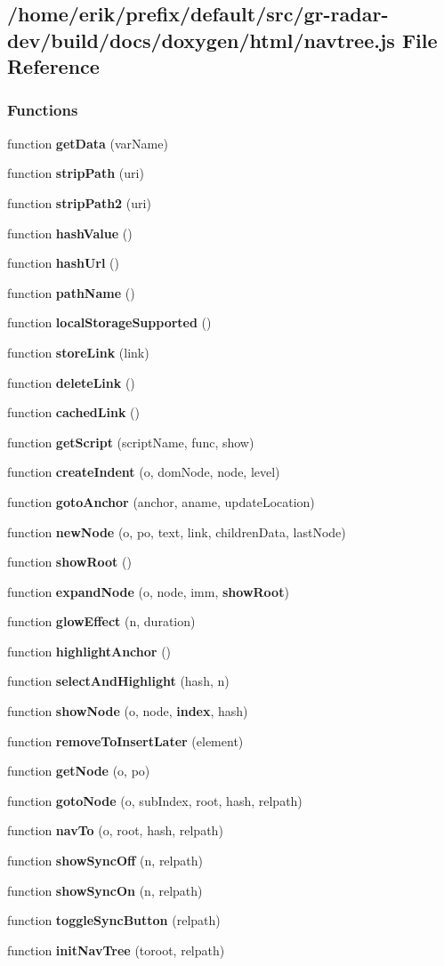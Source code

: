\subsection{/home/erik/prefix/default/src/gr-\/radar-\/dev/build/docs/doxygen/html/navtree.js File Reference}
\label{navtree_8js}
\subsubsection*{Functions}
\begin{DoxyCompactItemize}
\item 
function {\bf get\+Data} (var\+Name)
\item 
function {\bf strip\+Path} (uri)
\item 
function {\bf strip\+Path2} (uri)
\item 
function {\bf hash\+Value} ()
\item 
function {\bf hash\+Url} ()
\item 
function {\bf path\+Name} ()
\item 
function {\bf local\+Storage\+Supported} ()
\item 
function {\bf store\+Link} (link)
\item 
function {\bf delete\+Link} ()
\item 
function {\bf cached\+Link} ()
\item 
function {\bf get\+Script} (script\+Name, func, show)
\item 
function {\bf create\+Indent} (o, dom\+Node, node, level)
\item 
function {\bf goto\+Anchor} (anchor, aname, update\+Location)
\item 
function {\bf new\+Node} (o, po, text, link, children\+Data, last\+Node)
\item 
function {\bf show\+Root} ()
\item 
function {\bf expand\+Node} (o, node, imm, {\bf show\+Root})
\item 
function {\bf glow\+Effect} (n, duration)
\item 
function {\bf highlight\+Anchor} ()
\item 
function {\bf select\+And\+Highlight} (hash, n)
\item 
function {\bf show\+Node} (o, node, {\bf index}, hash)
\item 
function {\bf remove\+To\+Insert\+Later} (element)
\item 
function {\bf get\+Node} (o, po)
\item 
function {\bf goto\+Node} (o, sub\+Index, root, hash, relpath)
\item 
function {\bf nav\+To} (o, root, hash, relpath)
\item 
function {\bf show\+Sync\+Off} (n, relpath)
\item 
function {\bf show\+Sync\+On} (n, relpath)
\item 
function {\bf toggle\+Sync\+Button} (relpath)
\item 
function {\bf init\+Nav\+Tree} (toroot, relpath)
\end{DoxyCompactItemize}

